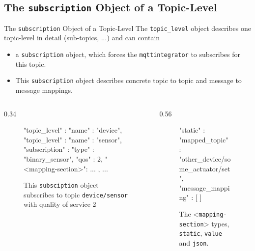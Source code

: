 ﻿\subsection{The \alert{\texttt{subscription}} Object of a \alert{Topic-Level}}

\begin{frame}[fragile]{The \texttt{\alert{subscription}} Object of a \alert{Topic-Level}}
  The \texttt{\textcolor{fh-ooe-red}{topic\_level}} object \alert{describes one topic-level in detail} (sub-topics, ...) and can contain
  \begin{itemize}
    \item a \texttt{\alert{subscription}} object, which forces the \texttt{\textcolor{fh-ooe-red}{mqttintegrator}} to subscribes for this topic.
    \item This \texttt{\alert{subscription}} object describes concrete \alert{topic to topic} and \alert{message to message} mappings.
  \end{itemize}
\begin{columns}[T, onlytextwidth]
\begin{column}{0.34\textwidth}
  \begin{figure}
  \begin{jsoncode}[autogobble=true]
        "topic_level" : {
            "name" : "device",
            "topic_level" : {
                "name" : "sensor",
                "subscription" : {
                    "type" : "binary_sensor",
                    "qos" : 2,
                    "<mapping-section>": {
                        ...
                    }
                },
                ...
            }
        }
  \end{jsoncode}
  \caption{This \alert{\texttt{subsciption}} object \alert{subscribes} to topic \textcolor{fh-ooe-red}{\texttt{device/sensor}} with \alert{quality of service} 2}
  \end{figure}
  \end{column}
  \begin{column}{0.56\textwidth}
  \begin{figure}
  \begin{jsoncode}[autogobble=true]
    "static" : {
        "mapped_topic" : "other_device/some_actuator/set",
        "message_mapping" : [{
        }]
    }
  \end{jsoncode}
  \caption{The <\textcolor{fh-ooe-red}{\texttt{mapping-section}}> types, \alert{\texttt{static}}, \alert{\texttt{value}} and \alert{\texttt{json}}.}
  \end{figure}
  \end{column}
\end{columns}
\end{frame}


